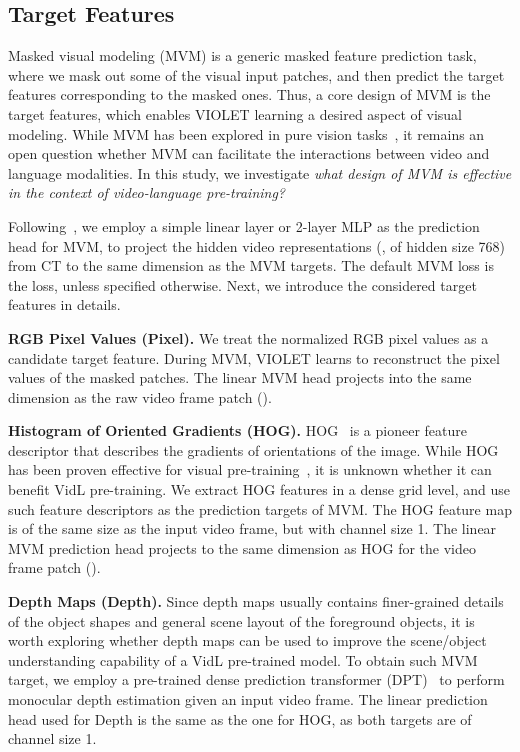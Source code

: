 \documentclass[10pt,twocolumn,letterpaper]{article}
\newcommand{\modelorig}{VIOLET\xspace}
\begin{document}
\subsection{Target Features} \label{sec:target_feat}
Masked visual modeling (MVM) is a generic masked feature prediction task, where we mask out some of the visual input patches, and then predict the target features corresponding to the masked ones. Thus, a core design of MVM is the target features, which enables \modelorig learning a desired aspect of visual modeling. While MVM has been explored in pure vision tasks~\cite{bao2022beit,he2022mae,wei2021masked-feat}, it remains an open question whether MVM can facilitate the interactions between video and language modalities. In this study, we investigate \textit{what design of MVM is effective in the context of video-language pre-training?} 

Following~\cite{xie2022simmim,wei2021masked-feat}, we employ a simple linear layer or 2-layer MLP as the prediction head for MVM, to project the hidden video representations (, of hidden size 768) from CT to the same dimension as the MVM targets. The default MVM loss is the  loss, unless specified otherwise. Next, we introduce the considered target features in details.


\vspace{0.5ex}
\noindent \textbf{RGB Pixel Values (Pixel).} We treat the normalized RGB pixel values as a candidate target feature. During MVM, \modelorig learns to reconstruct the pixel values of the masked patches. The linear MVM head projects  into the same dimension as the raw video frame patch ().


\vspace{0.5ex}
\noindent \textbf{Histogram of Oriented Gradients (HOG).} HOG~\cite{dalal2005hog} is a pioneer feature descriptor that describes the gradients of orientations of the image. 
While HOG has been proven effective for visual pre-training~\cite{wei2021masked-feat}, it is unknown whether it can benefit VidL pre-training. We extract HOG features in a dense grid level, and use such feature descriptors as the prediction targets of MVM. The HOG feature map is of the same size as the input video frame, but with channel size 1. The linear MVM prediction head projects  to the same dimension as HOG for the video frame patch ().

\vspace{0.5ex}
\noindent \textbf{Depth Maps (Depth).} Since depth maps usually contains finer-grained details of the object shapes and general scene layout of the foreground objects, it is worth exploring whether depth maps can be used to improve the scene/object understanding capability of a VidL pre-trained model. To obtain such MVM target, we employ a pre-trained dense prediction transformer (DPT)~\cite{ranftl2021dpt} to perform monocular depth estimation given an input video frame. The linear prediction head used for Depth is the same as the one for HOG, as both targets are of channel size 1.
\end{document}
